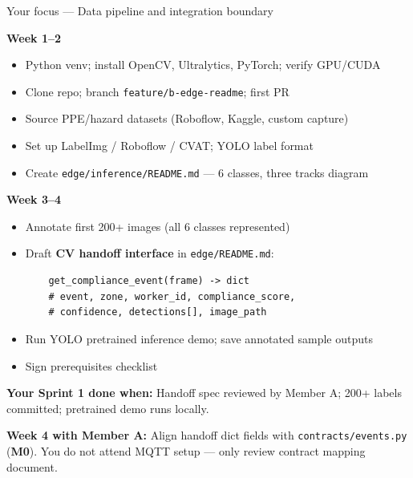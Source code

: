 \documentclass[12pt,a4paper]{article}
\begin{document}
\begin{sprintbox}{Your focus --- Data pipeline and integration boundary}

\begin{taskbox}
\textbf{Week 1--2}
\begin{itemize}
    \item Python venv; install OpenCV, Ultralytics, PyTorch; verify GPU/CUDA
    \item Clone repo; branch \texttt{feature/b-edge-readme}; first PR
    \item Source PPE/hazard datasets (Roboflow, Kaggle, custom capture)
    \item Set up LabelImg / Roboflow / CVAT; YOLO label format
    \item Create \texttt{edge/inference/README.md} --- 6 classes, three tracks diagram
\end{itemize}
\end{taskbox}

\begin{taskbox}
\textbf{Week 3--4}
\begin{itemize}
    \item Annotate first 200+ images (all 6 classes represented)
    \item Draft \textbf{CV handoff interface} in \texttt{edge/README.md}:
    \begin{verbatim}
    get_compliance_event(frame) -> dict
    # event, zone, worker_id, compliance_score,
    # confidence, detections[], image_path
    \end{verbatim}
    \item Run YOLO pretrained inference demo; save annotated sample outputs
    \item Sign prerequisites checklist
\end{itemize}
\end{taskbox}

\begin{deliverablebox}
\textbf{Your Sprint 1 done when:} Handoff spec reviewed by Member A; 200+ labels committed; pretrained demo runs locally.
\end{deliverablebox}

\begin{collabbox}
\textbf{Week 4 with Member A:} Align handoff dict fields with \texttt{contracts/events.py} (\textbf{M0}). You do not attend MQTT setup --- only review contract mapping document.
\end{collabbox}

\end{sprintbox}
\end{document}
